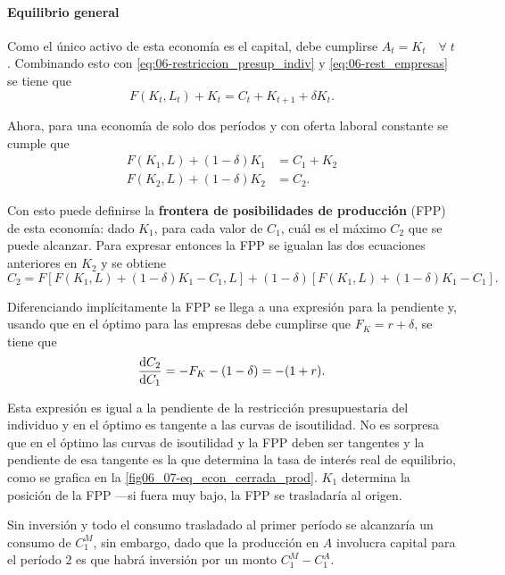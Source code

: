 \documentclass[DeGregorioResumen]{subfiles}
\begin{document}
\paragraph{Equilibrio general}
Como el único activo de esta economía es el capital, debe cumplirse $A_t=K_t \quad \forall \; t$. Combinando esto con \eqref{eq:06-restriccion_presup_indiv} y \eqref{eq:06-rest_empresas} se tiene que
\begin{equation}
	F(K_t, L_t) + K_t = C_t + K_{t+1} + \delta K_t.
\end{equation}

Ahora, para una economía de solo dos períodos y con oferta laboral constante se cumple que
\begin{align*}
	F(K_1, L) + (1-\delta)K_1 &= C_1 + K_2 \\
	F(K_2, L) + (1-\delta)K_2 &= C_2.
\end{align*}

Con esto puede definirse la \textbf{frontera de posibilidades de producción} (FPP) de esta economía: dado $K_1$, para cada valor de $C_1$, cuál es el máximo $C_2$ que se puede alcanzar. Para expresar entonces la FPP se igualan las dos ecuaciones anteriores en $K_2$ y se obtiene
\begin{equation}
	C_2 = F[F(K_1, L) + (1-\delta)K_1 - C_1, L] + (1-\delta)[F(K_1, L)+(1-\delta)K_1-C_1].
\end{equation}

Diferenciando implícitamente la FPP se llega a una expresión para la pendiente y, usando que en el óptimo para las empresas debe cumplirse que $F_K=r+\delta$, se tiene que
\begin{align*}
	\frac{\mathrm{d}C_2}{\mathrm{d}C_1} = -F_K - (1-\delta) = -(1+r).
\end{align*}

Esta expresión es igual a la pendiente de la restricción presupuestaria del individuo y en el óptimo es tangente a las curvas de isoutilidad. No es sorpresa que en el óptimo las curvas de isoutilidad y la FPP deben ser tangentes y la pendiente de esa tangente es la que determina la tasa de interés real de equilibrio, como se grafica en la \autoref{fig06_07-eq_econ_cerrada_prod}. $K_1$ determina la posición de la FPP ---si fuera muy bajo, la FPP se trasladaría al origen.



Sin inversión y todo el consumo trasladado al primer período se alcanzaría un consumo de $C_1^M$, sin embargo, dado que la producción en $A$ involucra capital para el período 2 es que habrá inversión por un monto $C_1^M-C_1^A$.
\end{document}
